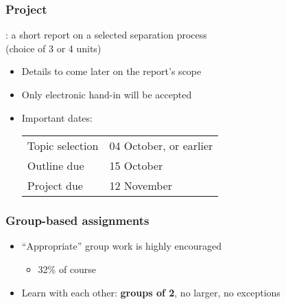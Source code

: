 \begin{frame}\frametitle{Project}
	\begin{exampleblock}{}
		\textbf{{\color{myBlue}{AIM}}}: a short report on a selected separation process \\(choice of 3 or 4 units)
	\end{exampleblock}
	\begin{itemize}
		\item	Details to come later on the report's scope
		\item	Only electronic hand-in will be accepted
		\item	Important dates:

		\vspace{12pt}
		\begin{tabular}{ll}
			Topic selection & 04 October, or earlier\\
			Outline due & 15 October\\
			Project due & 12 November\\
		\end{tabular}
	\end{itemize}
\end{frame}

\begin{frame}\frametitle{Group-based assignments}
	\begin{itemize}
		\item	``Appropriate'' group work is highly encouraged
		\begin{itemize}
			\item	32\% of course
		\end{itemize}
		\item	Learn with each other: \textbf{groups of 2}, no larger, no exceptions
	\end{itemize}
\end{frame}

